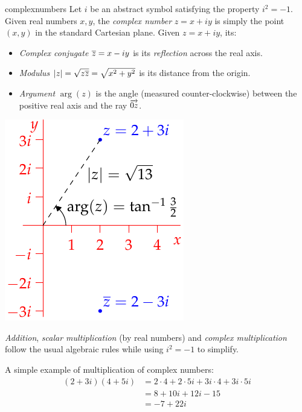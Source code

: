\begin{defn}[lower separated=false, sidebyside, sidebyside align=top seam, sidebyside gap=0pt, righthand width=0.32\linewidth]{}{complexnumbers}
	Let $i$ be an abstract symbol satisfying the property $i^2=-1$.\smallbreak
	Given real numbers $x,y$, the \emph{complex number} $z=x+iy$ is simply the point $(x,y)$ in the standard Cartesian plane.\footnotemark\smallbreak
	Given $z=x+iy$, its:\vspace{-5pt}
	\begin{itemize}\itemsep0pt
	  \item \emph{Complex conjugate} $\overline{z}=x-iy$ is its \emph{reflection} across the real axis.
	  \item \emph{Modulus} $\left| z\right|=\sqrt{z\overline{z}}=\sqrt{x^2+y^2}$ is its distance from the origin.
	  \item \emph{Argument} $\arg(z)$ is the angle (measured counter-clockwise) between the positive real axis and the ray $\overrightarrow{0z}$. 
	\end{itemize}
	\tcblower
	\flushright\includegraphics[scale=0.9]{complex-argand}
\end{defn}


\emph{Addition}, \emph{scalar multiplication} (by real numbers) and \emph{complex multiplication} follow the usual algebraic rules while using $i^2=-1$ to simplify.

\begin{example}{}{}
	A simple example of multiplication of complex numbers:
	\begin{align*}
		(2+3i)(4+5i)&=2\cdot 4+2\cdot 5i+3i\cdot 4+3i\cdot 5i\tag{multiply out}\\
		&=8+10i+12i-15 \tag{use $i^2=-1$ to simplify}\\
		&=-7+22i
	\end{align*}
\end{example}

